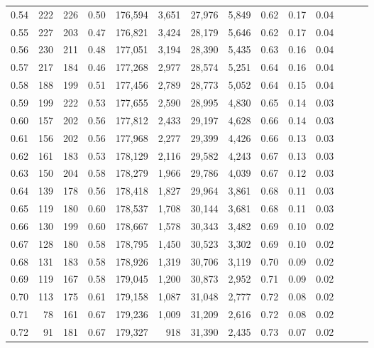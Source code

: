 \begin{tabular}{rrrrrrrrrrrrrr}
0.54 &     222 &  226 &  0.50 &  176,594 &    3,651 &  27,976 &   5,849 &  0.62 &  0.17 &      0.04 \\
0.55 &     227 &  203 &  0.47 &  176,821 &    3,424 &  28,179 &   5,646 &  0.62 &  0.17 &      0.04 \\
0.56 &     230 &  211 &  0.48 &  177,051 &    3,194 &  28,390 &   5,435 &  0.63 &  0.16 &      0.04 \\
0.57 &     217 &  184 &  0.46 &  177,268 &    2,977 &  28,574 &   5,251 &  0.64 &  0.16 &      0.04 \\
0.58 &     188 &  199 &  0.51 &  177,456 &    2,789 &  28,773 &   5,052 &  0.64 &  0.15 &      0.04 \\
0.59 &     199 &  222 &  0.53 &  177,655 &    2,590 &  28,995 &   4,830 &  0.65 &  0.14 &      0.03 \\
0.60 &     157 &  202 &  0.56 &  177,812 &    2,433 &  29,197 &   4,628 &  0.66 &  0.14 &      0.03 \\
0.61 &     156 &  202 &  0.56 &  177,968 &    2,277 &  29,399 &   4,426 &  0.66 &  0.13 &      0.03 \\
0.62 &     161 &  183 &  0.53 &  178,129 &    2,116 &  29,582 &   4,243 &  0.67 &  0.13 &      0.03 \\
0.63 &     150 &  204 &  0.58 &  178,279 &    1,966 &  29,786 &   4,039 &  0.67 &  0.12 &      0.03 \\
0.64 &     139 &  178 &  0.56 &  178,418 &    1,827 &  29,964 &   3,861 &  0.68 &  0.11 &      0.03 \\
0.65 &     119 &  180 &  0.60 &  178,537 &    1,708 &  30,144 &   3,681 &  0.68 &  0.11 &      0.03 \\
0.66 &     130 &  199 &  0.60 &  178,667 &    1,578 &  30,343 &   3,482 &  0.69 &  0.10 &      0.02 \\
0.67 &     128 &  180 &  0.58 &  178,795 &    1,450 &  30,523 &   3,302 &  0.69 &  0.10 &      0.02 \\
0.68 &     131 &  183 &  0.58 &  178,926 &    1,319 &  30,706 &   3,119 &  0.70 &  0.09 &      0.02 \\
0.69 &     119 &  167 &  0.58 &  179,045 &    1,200 &  30,873 &   2,952 &  0.71 &  0.09 &      0.02 \\
0.70 &     113 &  175 &  0.61 &  179,158 &    1,087 &  31,048 &   2,777 &  0.72 &  0.08 &      0.02 \\
0.71 &      78 &  161 &  0.67 &  179,236 &    1,009 &  31,209 &   2,616 &  0.72 &  0.08 &      0.02 \\
0.72 &      91 &  181 &  0.67 &  179,327 &      918 &  31,390 &   2,435 &  0.73 &  0.07 &      0.02 \\

\end{tabular}
